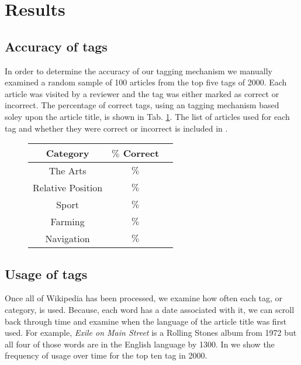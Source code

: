 

\section{Results}

\subsection{Accuracy of tags}

In order to determine the accuracy of our tagging mechanism we manually examined a random sample of 100 articles from the top five tags of 2000.
Each article was visited by a reviewer and the tag was either marked as correct or incorrect.
The percentage of correct tags, using an tagging mechanism based soley upon the article title, is shown in Tab. \ref{tab:tagaccuracy}.
The list of articles used for each tag and whether they were correct or incorrect is included in .

\begin{figure}[!tp]
  \centering
    \begin{tabular}{ |c|c|c| }
      \hline
      Category           & $\%$ Correct \\
      \hline
      The Arts           & $\%$ \\
      \hline
      Relative Position  & $\%$ \\
      \hline
      Sport              & $\%$ \\
      \hline
      Farming            & $\%$ \\
      \hline
      Navigation         & $\%$ \\
      \hline
    \end{tabular}
    \caption{
    }\label{tab:tagaccuracy}
\end{figure}


\subsection{Usage of tags}

Once all of Wikipedia has been processed, we examine how often each tag, or category, is used.
Because, each word has a date associated with it, we can scroll back through time and examine when the language of the article title was first used.
For example, \textit{Exile on Main Street} is a Rolling Stones album from 1972 but all four of those words are in the English language by 1300.
In  we show the frequency of usage over time for the top ten tag in 2000.

